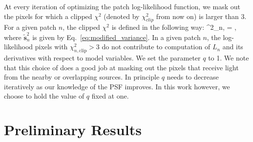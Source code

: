 At every iteration of optimizing the patch log-likelihood function, we mask out the pixels for which a clipped $\chi^{2}$ 
(denoted by $\chi^{2}_{clip}$ from now on) is larger than 3. For a given patch $n$, the clipped $\chi^{2}$ is defined in the following way:
\beq
\chi^{2}_{n,} = , 
\label{eq:chi_clip}
\eeq
where $\tilde{\mathbf{s}}_{n}^{2}$ is given by Eq.~\ref{eq:modified_variance}. In a given patch $n$, the log-likelihood pixels with $\chi^{2}_{n,\mathrm{clip}} > 3$ 
do not contribute to computation of $L_n$ and its derivatives with respect to model variables. 
We set the parameter $q$ to 1. We note that this choice of does a good job at masking out the pixels that receive light from the nearby or overlapping sources. 
In principle $q$ needs to decrease iteratively as our knowledge of the PSF improves. In this work however, we choose to hold the value of $q$ fixed at one. 



%




\section{Preliminary Results}\label{sec:hstresults}

